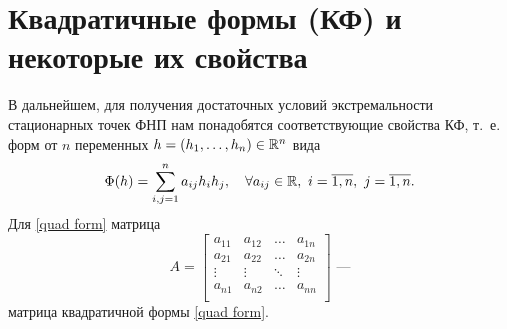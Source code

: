 \documentclass[../../main.tex]{subfiles}
\begin{document}
	\section{Квадратичные формы (КФ) и некоторые их свойства}
	В дальнейшем, для получения достаточных условий экстремальности
	стационарных точек ФНП нам понадобятся соответствующие свойства КФ,
	т.~е. форм от $n$ переменных $h = (h_1, \ldots, h_n) \in \mathbb{R}^n$ вида
	\begin{equation}
	\label{quad form}
		\Phi(h) = \sum_{i, j = 1}^n a_{i j} h_i h_j,
		\quad \forall a_{i j} \in \mathbb{R},\ i = \overline{1, n},\ j = \overline{1, n}.
	\end{equation}
	Для \eqref{quad form} матрица
	\begin{equation}
	\label{form matrix}
		A =
		\begin{bmatrix}
			a_{1 1} & a_{1 2} & \ldots & a_{1 n} \\
			a_{2 1} & a_{2 2} & \ldots & a_{2 n} \\
			\vdots & \vdots & \ddots & \vdots \\
			a_{n 1} & a_{n 2} & \ldots & a_{n n} \\
		\end{bmatrix}
		\text{ ---}
	\end{equation}
	матрица квадратичной формы \eqref{quad form}.
	
\end{document}
